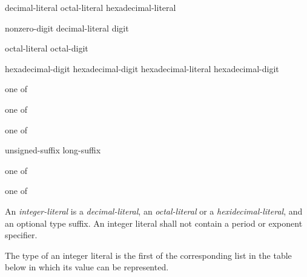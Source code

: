 
\begin{grammar}
  \br
  decimal-literal \br
  octal-literal \br
  hexadecimal-literal 

  \br
  nonzero-digit\br
  decimal-literal digit

  \br
  octal-literal octal-digit

  \br
   hexadecimal-digit\br
   hexadecimal-digit\br
  hexadecimal-literal hexadecimal-digit

   \textnormal{one of}\br

   \textnormal{one of}\br

   \textnormal{one of}\br
  \br
  \br

  \br
  unsigned-suffix \br
  long-suffix 

   \textnormal{one of}\br

   \textnormal{one of}\br
\end{grammar}

\p An \textit{integer-literal} is a \textit{decimal-literal}, an
\textit{octal-literal} or a \textit{hexidecimal-literal}, and an optional type
suffix. An integer literal shall not contain a period or exponent specifier.

\p The type of an integer literal is the first of the corresponding list in the
table below in which its value can be represented.

